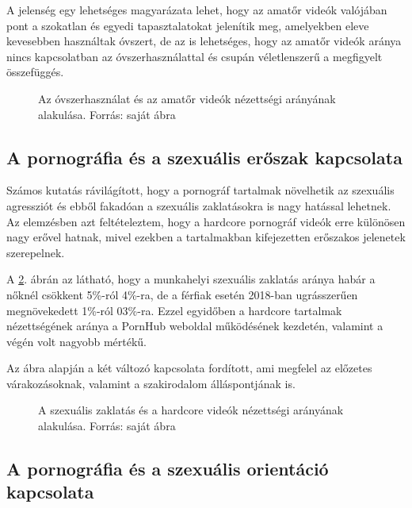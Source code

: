\documentclass[12pt,a4paper]{article}
\begin{document}
A jelenség egy lehetséges magyarázata lehet, hogy az amatőr videók valójában pont a szokatlan és egyedi tapasztalatokat jelenítik meg, amelyekben eleve kevesebben használtak óvszert, de az is lehetséges, hogy az amatőr videók aránya nincs kapcsolatban az óvszerhasználattal és csupán véletlenszerű a megfigyelt összefüggés.

\begin{figure}[h]
    \caption[Amatőr videók és óvszerhasználat]{\footnotesize{Az óvszerhasználat és az amatőr videók nézettségi arányának alakulása. Forrás: saját ábra}}
    \label{condom.amateur}
    \begin{center}
        
    \end{center}
\end{figure}

\subsection{A pornográfia és a szexuális erőszak kapcsolata}

Számos kutatás rávilágított, hogy a pornográf tartalmak növelhetik az szexuális agressziót és ebből fakadóan a szexuális zaklatásokra is nagy hatással lehetnek. Az elemzésben azt feltételeztem, hogy a hardcore pornográf videók erre különösen nagy erővel hatnak, mivel ezekben a tartalmakban kifejezetten erőszakos jelenetek szerepelnek.

A \ref{harrasment.hardcore}. ábrán az látható, hogy a munkahelyi szexuális zaklatás aránya habár a nőknél csökkent 5\%-ról 4\%-ra, de a férfiak esetén 2018-ban ugrásszerűen megnövekedett 1\%-ról 03\%-ra. Ezzel egyidőben a hardcore tartalmak nézettségének aránya a PornHub weboldal működésének kezdetén, valamint a végén volt nagyobb mértékű.

Az ábra alapján a két változó kapcsolata fordított, ami megfelel az előzetes várakozásoknak, valamint a szakirodalom álláspontjának is.

\begin{figure}[h]
    \caption[Hardcore videók és szexuális zaklatás]{\footnotesize{A szexuális zaklatás és a hardcore videók nézettségi arányának alakulása. Forrás: saját ábra}}
    \label{harrasment.hardcore}
    \begin{center}
        
    \end{center}
\end{figure}

\subsection{A pornográfia és a szexuális orientáció kapcsolata}
\end{document}
